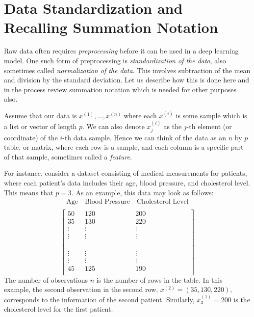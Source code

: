 \documentclass[12pt]{article}
\begin{document}
\section{Data Standardization and Recalling Summation Notation}
\label{sec:summation}
Raw data often requires \textit{preprocessing} before it can be used in a deep learning model. One such form of preprocessing is \textit{standardization of the data}, also sometimes called \textit{normalization of the data}. This involves subtraction of the mean and division by the standard deviation. Let us describe how this is done here and in the process review summation notation which is needed for other purposes also.

Assume that our data is $x^{(1)}, \ldots, x^{(n)}$ where each $x^{(i)}$ is some sample which is a list or vector of length $p$. We can also denote $x_j^{(i)}$ as the $j$-th element (or coordinate) of the $i$-th data sample. Hence we can think of the data as an $n$ by $p$ table, or matrix, where each row is a sample, and each column is a specific part of that sample, sometimes called a {\em feature}.

For instance, consider a dataset consisting of medical measurements for patients, where each patient's data includes their age, blood pressure, and cholesterol level. This means that $p=3$. As an example, this data may look as follows:
%
\[
\begin{array}{c}
\text{Age} \quad \text{Blood Pressure} \quad \text{Cholesterol Level} \\
\end{array}
\]
\begin{equation}
\label{eq:data-table}
\left[ \begin{array}{ccc}
50 & 120 & 200 \\
35 & 130 & 220 \\
\vdots & \vdots & \vdots \\
\vdots & \vdots & \vdots \\
\phantom{\text{Age}} & \phantom{\text{Blood Pressure}} & \phantom{\text{Cholesterol Level}}\\
\vdots & \vdots & \vdots \\
\vdots & \vdots & \vdots \\
45 & 125 & 190 \\
\end{array} \right]
\end{equation}
%
The number of observations $n$ is the number of rows in the table.
In this example, the second observation in the second row, $x^{(2)}= (35,130,220)$, corresponds to the information of the second patient. Similarly, $x_3^{(1)} = 200$ is the cholesterol level for the first patient. 
\end{document}
